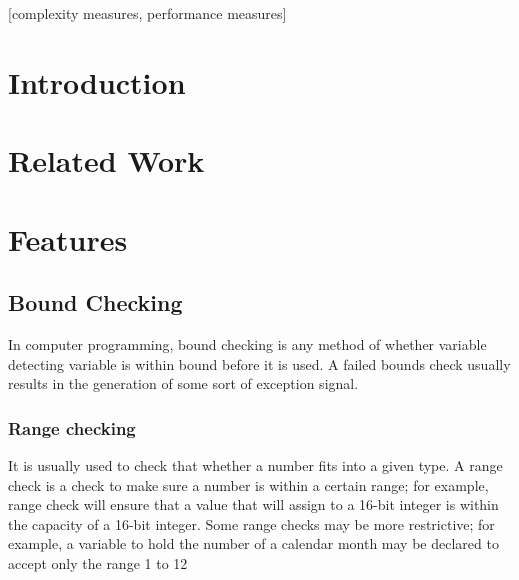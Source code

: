 \documentclass{sig-alternate}
\begin{document}
\maketitle
\begin{abstract}

\end{abstract}

[complexity measures, performance measures]



\section{Introduction}



\section{Related Work}

\section{Features}

\subsection{Bound Checking}
In computer programming, bound checking is any method of whether variable detecting variable is within bound before it is used.  A failed bounds check usually results in the generation of some sort of exception signal.
\subsubsection{Range checking}
It is usually used to check that whether a number fits into a given type. A range check is a check to make sure a number is within a certain range; for example, range check will ensure that a value that will assign to a 16-bit integer is within the capacity of a 16-bit integer. Some range checks may be more restrictive; for example, a variable to hold the number of a calendar month may be declared to accept only the range 1 to 12
\end{document}
